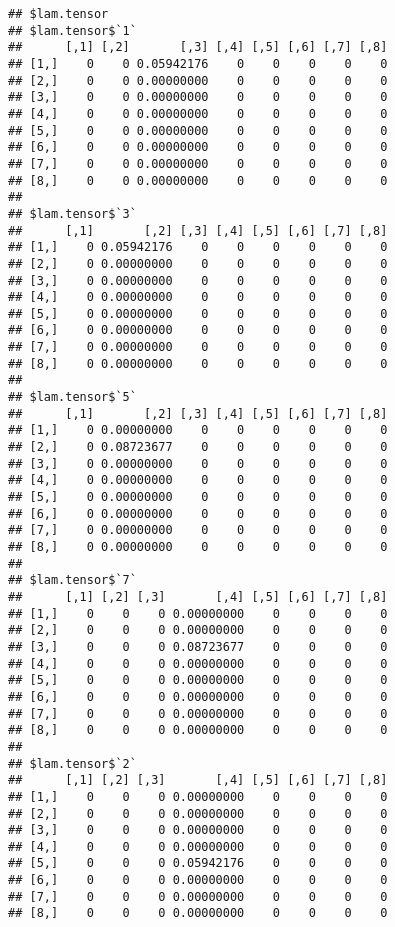 \documentclass[
]{article}
\begin{document}
\begin{verbatim}
## $lam.tensor
## $lam.tensor$`1`
##      [,1] [,2]       [,3] [,4] [,5] [,6] [,7] [,8]
## [1,]    0    0 0.05942176    0    0    0    0    0
## [2,]    0    0 0.00000000    0    0    0    0    0
## [3,]    0    0 0.00000000    0    0    0    0    0
## [4,]    0    0 0.00000000    0    0    0    0    0
## [5,]    0    0 0.00000000    0    0    0    0    0
## [6,]    0    0 0.00000000    0    0    0    0    0
## [7,]    0    0 0.00000000    0    0    0    0    0
## [8,]    0    0 0.00000000    0    0    0    0    0
## 
## $lam.tensor$`3`
##      [,1]       [,2] [,3] [,4] [,5] [,6] [,7] [,8]
## [1,]    0 0.05942176    0    0    0    0    0    0
## [2,]    0 0.00000000    0    0    0    0    0    0
## [3,]    0 0.00000000    0    0    0    0    0    0
## [4,]    0 0.00000000    0    0    0    0    0    0
## [5,]    0 0.00000000    0    0    0    0    0    0
## [6,]    0 0.00000000    0    0    0    0    0    0
## [7,]    0 0.00000000    0    0    0    0    0    0
## [8,]    0 0.00000000    0    0    0    0    0    0
## 
## $lam.tensor$`5`
##      [,1]       [,2] [,3] [,4] [,5] [,6] [,7] [,8]
## [1,]    0 0.00000000    0    0    0    0    0    0
## [2,]    0 0.08723677    0    0    0    0    0    0
## [3,]    0 0.00000000    0    0    0    0    0    0
## [4,]    0 0.00000000    0    0    0    0    0    0
## [5,]    0 0.00000000    0    0    0    0    0    0
## [6,]    0 0.00000000    0    0    0    0    0    0
## [7,]    0 0.00000000    0    0    0    0    0    0
## [8,]    0 0.00000000    0    0    0    0    0    0
## 
## $lam.tensor$`7`
##      [,1] [,2] [,3]       [,4] [,5] [,6] [,7] [,8]
## [1,]    0    0    0 0.00000000    0    0    0    0
## [2,]    0    0    0 0.00000000    0    0    0    0
## [3,]    0    0    0 0.08723677    0    0    0    0
## [4,]    0    0    0 0.00000000    0    0    0    0
## [5,]    0    0    0 0.00000000    0    0    0    0
## [6,]    0    0    0 0.00000000    0    0    0    0
## [7,]    0    0    0 0.00000000    0    0    0    0
## [8,]    0    0    0 0.00000000    0    0    0    0
## 
## $lam.tensor$`2`
##      [,1] [,2] [,3]       [,4] [,5] [,6] [,7] [,8]
## [1,]    0    0    0 0.00000000    0    0    0    0
## [2,]    0    0    0 0.00000000    0    0    0    0
## [3,]    0    0    0 0.00000000    0    0    0    0
## [4,]    0    0    0 0.00000000    0    0    0    0
## [5,]    0    0    0 0.05942176    0    0    0    0
## [6,]    0    0    0 0.00000000    0    0    0    0
## [7,]    0    0    0 0.00000000    0    0    0    0
## [8,]    0    0    0 0.00000000    0    0    0    0

\end{verbatim}
\end{document}
